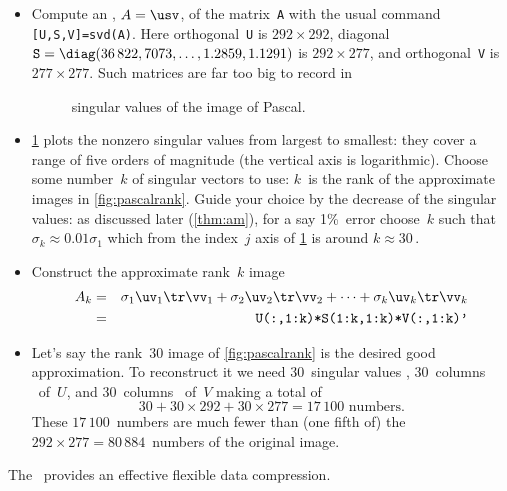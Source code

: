 \begin{example}
\begin{solution}
\begin{itemize}
\item Compute an \svd, \(A=\usv\), of the matrix~\verb|A| with the usual command \verb|[U,S,V]=svd(A)|.
Here orthogonal~\verb|U| is \(292\times292\), diagonal \(\sloppy\verb|S|=\diag(36\,822, 7073,  \ldots,1.2859, 1.1291)\) is \(292\times277\), and orthogonal~\verb|V| is \(277\times277\).
Such matrices are far too big to record in 
\setbox\ajrqrbox\hbox{}%
\marginajrbox%


\begin{figure}
\caption{singular values of the image of Pascal.}
\label{fig:pascalsing}
\centering

\end{figure}
\item \cref{fig:pascalsing} plots the nonzero singular values from largest to smallest: they cover a range of five orders of magnitude (the vertical axis is logarithmic).
Choose some number~\(k\) of singular vectors to use: \(k\)~is the rank of the approximate images in \cref{fig:pascalrank}.
Guide your choice by the decrease of the singular values: as discussed later (\cref{thm:am}), for a say 1\%~error choose~\(k\) such that \(\sigma_k\approx 0.01\sigma_1\) which from the index~\(j\) axis of \cref{fig:pascalsing} is around \(k\approx 30\)\,.

\item Construct the approximate rank~\(k\) image
\begin{eqnarray*}
A_k&=&\sigma_1\uv_1\tr\vv_1+\sigma_2\uv_2\tr\vv_2+\cdots+\sigma_k\uv_k\tr\vv_k
\\&=&\verb|U(:,1:k)*S(1:k,1:k)*V(:,1:k)'|
\end{eqnarray*}

\item Let's say the rank~\(30\) image of \cref{fig:pascalrank} is the desired good approximation.  
To reconstruct it we need \(30\)~singular values \hlist{}, \(30\)~columns \hlist{}\ of~\(U\), and \(30\)~columns \hlist{}\ of~\(V\) making a total of
\begin{equation*}
30+30\times292+30\times277=17\,100\text{ numbers}.
\end{equation*}
These \(17\,100\)~numbers are much fewer than (one fifth of) the \(292\times277=80\,884\)~numbers of the original image.
\end{itemize}
The \svd\ provides an effective flexible data compression.
\end{solution}
\end{example}











